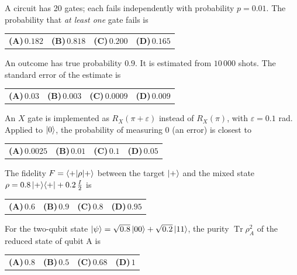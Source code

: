 \documentclass[11pt,a4paper]{article}
\newcommand{\optlabel}[1]{\textbf{(#1)}}
\newenvironment{qitem}[1]{\begin{list}{}{\setlength{\leftmargin}{3.3em}\setlength{\labelwidth}{3.1em}%
  \setlength{\labelsep}{0.2em}\setlength{\topsep}{3pt}\setlength{\parsep}{3pt}}\item[\textbf{Q.#1}\hfill]}{\end{list}}
\newcommand{\qsep}{\par\vspace{2pt}{\color{black!15}\hrule}\vspace{4pt}}
\begin{document}
\begin{qitem}{7}
A circuit has 20 gates; each fails independently with probability $p = 0.01$. The probability that \emph{at least one} gate fails is
\par\smallskip\noindent\begin{tabularx}{\linewidth}{@{}*{4}{L}@{}}
\optlabel{A}\,$0.182$ & \optlabel{B}\,$0.818$ & \optlabel{C}\,$0.200$ & \optlabel{D}\,$0.165$
\end{tabularx}
\end{qitem}
\qsep

\begin{qitem}{8}
An outcome has true probability $0.9$. It is estimated from $10\,000$ shots. The standard error of the estimate is
\par\smallskip\noindent\begin{tabularx}{\linewidth}{@{}*{4}{L}@{}}
\optlabel{A}\,$0.03$ & \optlabel{B}\,$0.003$ & \optlabel{C}\,$0.0009$ & \optlabel{D}\,$0.009$
\end{tabularx}
\end{qitem}
\qsep

\begin{qitem}{9}
An $X$ gate is implemented as $R_X(\pi + \varepsilon)$ instead of $R_X(\pi)$, with $\varepsilon = 0.1$ rad. Applied to $\ket0$, the
probability of measuring $0$ (an error) is closest to
\par\smallskip\noindent\begin{tabularx}{\linewidth}{@{}*{4}{L}@{}}
\optlabel{A}\,$0.0025$ & \optlabel{B}\,$0.01$ & \optlabel{C}\,$0.1$ & \optlabel{D}\,$0.05$
\end{tabularx}
\end{qitem}
\qsep

\begin{qitem}{10}
The fidelity $F = \braket{+|\rho|+}$ between the target $\ket+$ and the mixed state $\rho = 0.8\ket+\!\bra+ + 0.2\,\frac I2$ is
\par\smallskip\noindent\begin{tabularx}{\linewidth}{@{}*{4}{L}@{}}
\optlabel{A}\,$0.6$ & \optlabel{B}\,$0.9$ & \optlabel{C}\,$0.8$ & \optlabel{D}\,$0.95$
\end{tabularx}
\end{qitem}
\qsep

\begin{qitem}{11}
For the two-qubit state $\ket\psi = \sqrt{0.8}\ket{00} + \sqrt{0.2}\ket{11}$, the purity $\operatorname{Tr}\rho_A^2$ of the reduced state of qubit A is
\par\smallskip\noindent\begin{tabularx}{\linewidth}{@{}*{4}{L}@{}}
\optlabel{A}\,$0.8$ & \optlabel{B}\,$0.5$ & \optlabel{C}\,$0.68$ & \optlabel{D}\,$1$
\end{tabularx}
\end{qitem}
\qsep
\end{document}
